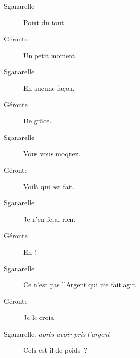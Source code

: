 \documentclass[french,twoside]{book} %
\begin{document}
 \begin{description} \item[Sganarelle] 

Point du tout.\end{description}
 \begin{description} \item[Géronte] 

Un petit moment.\end{description}
 \begin{description} \item[Sganarelle] 

En aucune façon.\end{description}
 \begin{description} \item[Géronte] 

De grâce.\end{description}
 \begin{description} \item[Sganarelle] 

Vous vous moquez.\end{description}
 \begin{description} \item[Géronte] 

Voilà qui est fait.\end{description}
 \begin{description} \item[Sganarelle] 

Je n’en ferai rien.\end{description}
 \begin{description} \item[Géronte] 

Eh !\end{description}
 \begin{description} \item[Sganarelle] 

Ce n’est pas l’Argent qui me fait agir.\end{description}
 \begin{description} \item[Géronte] 

Je le crois.\end{description}
 \begin{description} \item[Sganarelle\textit{, après avoir pris l’argent}\par
] 

Cela est-il de poids ?\end{description}
\end{document}

